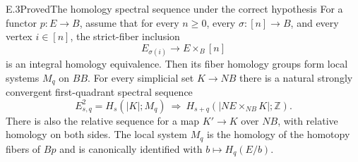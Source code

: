 \begin{claim}{E.3}{Proved}{The homology spectral sequence under the correct hypothesis}
For a functor $p:E\to B$, assume that for every $n\ge0$, every
$\sigma:[n]\to B$, and every vertex $i\in[n]$, the strict-fiber
inclusion
\[
             E_{\sigma(i)}\longrightarrow E\times_B[n]
                                                               \tag{E.3.1}
\]
is an integral homology equivalence. Then its fiber homology groups
form local systems $M_q$ on $BB$. For every simplicial set $K\to NB$
there is a natural strongly convergent first-quadrant spectral sequence
\[
       E^2_{s,q}=H_s(|K|;M_q)\ \Longrightarrow\
                H_{s+q}(|NE\times_{NB}K|;\mathbb Z).
                                                               \tag{E.3.2}
\]
There is also the relative sequence for a map $K'\to K$ over $NB$,
with relative homology on both sides. The local system $M_q$ is the
homology of the homotopy fibers of $Bp$ and is canonically identified
with $b\mapsto H_q(E/b)$.
\end{claim}
